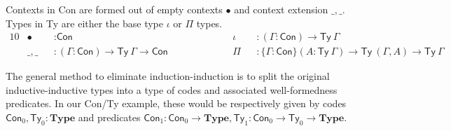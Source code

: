 \documentclass[a4paper,UKenglish,cleveref, autoref, thm-restate]{lipics-v2019}
\newcommand{\GG}{\Gamma}
\newcommand{\mType}{\mathbf{Type}}
\begin{document}
Contexts in \textsf{Con} are formed out of empty contexts $\bullet$ and context
extension $\_,\_$. Types in \textsf{Ty} are either the base type $\iota$ or
$\Pi$ types.
\begin{alignat*}{10}
  & \bullet && : \textsf{Con}                                                          &&  \iota && : (\GG : \textsf{Con}) \to \textsf{Ty}\ \GG \\
  & \_,\_ && : (\GG : \textsf{Con}) \to \textsf{Ty}\ \GG \to \textsf{Con} \hspace{5em} &&  \Pi && : \{\GG : \textsf{Con}\} (A : \textsf{Ty}\ \GG) \to \textsf{Ty}\ (\GG , A) \to \textsf{Ty}\ \GG
\end{alignat*}

The general method to eliminate induction-induction is to split the original
inductive-inductive types into a type of codes and associated well-formedness
predicates. In our \textsf{Con/Ty} example, these would be respectively given by
codes $\textsf{Con}_0, \textsf{Ty}_0 : \mType$ and predicates $\textsf{Con}_1 :
\textsf{Con}_0 \to \mType, \textsf{Ty}_1 : \textsf{Con}_0 \to \textsf{Ty}_0 \to
\mType$.
\end{document}

